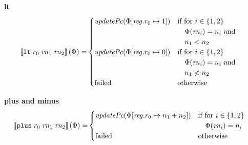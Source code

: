 \documentclass[a4paper]{article}
\begin{document}
\noindent\textbf{lt}\\
\begin{align*}
  \sem{\tlt{r_0}{\rn_1}{\rn_2}}(\Phi) = &
                                                  \begin{cases}
                                                    \updPcAddr{\Phi\updReg{r_0}{1}} &
                                                    \arraycolsep=0pt
                                                    \begin{array}[t]{l}
                                                      \text{if for $i \in \{1,2\}$}\\
                                                      \quad\Phi(\rn_i) = n_i \tand\\
                                                      \quad n_1 < n_2
                                                    \end{array}\\
                                                    \updPcAddr{\Phi\updReg{r_0}{0}} &
                                                    \arraycolsep=0pt
                                                    \begin{array}[t]{l}
                                                      \text{if for $i \in \{1,2\}$}\\
                                                      \quad \Phi(\rn_i) = n_i \tand \\
                                                      \quad n_1 \not< n_2\\
                                                    \end{array}\\
                                                    \failed & \text{otherwise}
                                                  \end{cases}  
\end{align*}

\noindent\textbf{plus and minus}\\
\begin{align*}
  \sem{\tplus{r_0}{\rn_1}{\rn_2}}(\Phi) = &
                                                  \begin{cases}
                                                    \updPcAddr{\Phi\updReg{r_0}{n_1+n_2}} &
                                                    \arraycolsep=0pt
                                                    \begin{array}[t]{l}
                                                      \text{if for $i \in \{1,2\}$}\\
                                                      \quad \Phi(\rn_i) = n_i\\
                                                    \end{array}\\
                                                    \failed & \text{otherwise}
                                                  \end{cases}  
\end{align*}
\end{document}
